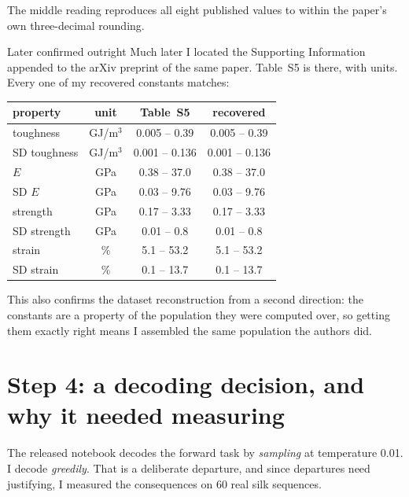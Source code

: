 The middle reading reproduces all eight published values to within the paper's
own three-decimal rounding.

\begin{goodbox}{Later confirmed outright}
Much later I located the Supporting Information appended to the arXiv preprint
of the same paper. Table~S5 is there, with units. Every one of my recovered
constants matches:

\begin{center}
\small
\begin{tabular}{lccc}
\toprule
property & unit & Table~S5 & recovered \\
\midrule
toughness & GJ/m$^3$ & 0.005 -- 0.39 & 0.005 -- 0.39 \\
SD toughness & GJ/m$^3$ & 0.001 -- 0.136 & 0.001 -- 0.136 \\
$E$ & GPa & 0.38 -- 37.0 & 0.38 -- 37.0 \\
SD $E$ & GPa & 0.03 -- 9.76 & 0.03 -- 9.76 \\
strength & GPa & 0.17 -- 3.33 & 0.17 -- 3.33 \\
SD strength & GPa & 0.01 -- 0.8 & 0.01 -- 0.8 \\
strain & \% & 5.1 -- 53.2 & 5.1 -- 53.2 \\
SD strain & \% & 0.1 -- 13.7 & 0.1 -- 13.7 \\
\bottomrule
\end{tabular}
\end{center}

This also confirms the dataset reconstruction from a second direction: the
constants are a property of the population they were computed over, so getting
them exactly right means I assembled the same population the authors did.
\end{goodbox}

\section{Step 4: a decoding decision, and why it needed measuring}
\label{sec:decodingchoice}

The released notebook decodes the forward task by \emph{sampling} at
temperature 0.01. I decode \emph{greedily}. That is a deliberate departure, and
since departures need justifying, I measured the consequences on 60 real silk
sequences.

